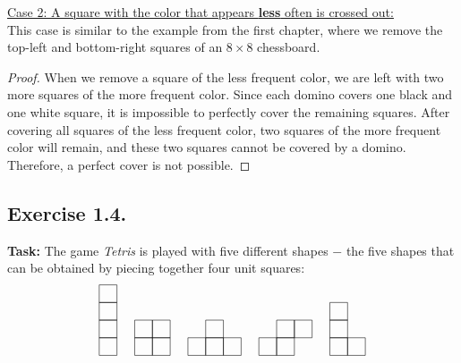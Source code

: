 \documentclass{article}
\begin{document}
\underline{Case 2: A square with the color that appears \textbf{less} often is crossed out:}\\
This case is similar to the example from the first chapter, where we remove the top-left and bottom-right squares of an $8 \times 8$ chessboard.

\begin{proof} When we remove a square of the less frequent color, we are left with two more squares of the more frequent color. Since each domino covers one black and one white square, it is impossible to perfectly cover the remaining squares. After covering all squares of the less frequent color, two squares of the more frequent color will remain, and these two squares cannot be covered by a domino. Therefore, a perfect cover is not possible. \end{proof}

\newpage

\subsection{Exercise 1.4.}
\textbf{Task:} The game \textit{Tetris} is played with five different shapes $-$ the five shapes that can be obtained by piecing together four unit squares:\\

\[
\begin{tikzpicture}[scale=0.5] %

\begin{scope}
\foreach \y in {0,1,2,3} {
  \draw (0,\y) rectangle (1,\y+1);
}
\end{scope}

\begin{scope}[shift={(2,0)}]
\foreach \x in {0,1} {
  \foreach \y in {0,1} {
    \draw (\x,\y) rectangle (\x+1,\y+1);
  }
}
\end{scope}

\begin{scope}[shift={(5,0)}]
\draw (0,0) rectangle (1,1);
\draw (1,0) rectangle (2,1);
\draw (2,0) rectangle (3,1);
\draw (1,1) rectangle (2,2);
\end{scope}

\begin{scope}[shift={(9,0)}]
\draw (0,0) rectangle (1,1);
\draw (1,0) rectangle (2,1);
\draw (1,1) rectangle (2,2);
\draw (2,1) rectangle (3,2);
\end{scope}

\begin{scope}[shift={(13,0)}]
\draw (0,0) rectangle (1,1);
\draw (0,1) rectangle (1,2);
\draw (0,2) rectangle (1,3);
\draw (1,0) rectangle (2,1);
\end{scope}

\end{tikzpicture} \]
\end{document}
